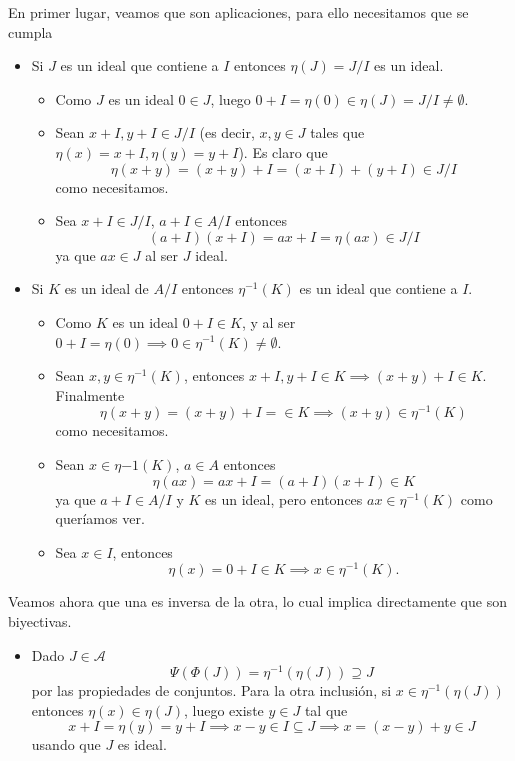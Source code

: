 \begin{proofbox}
    En primer lugar, veamos que son aplicaciones, para ello necesitamos que se cumpla
    \begin{itemize}
        \item Si $J$ es un ideal que contiene a $I$ entonces $\eta(J) = J/I$ es un ideal.
        \begin{itemize}
            \item Como $J$ es un ideal $0 \in J$, luego $0 + I = \eta(0) \in \eta(J) = J/I \neq \emptyset$.
            \item Sean $x + I, y + I \in J/I$ (es decir, $x, y \in J$ tales que $\eta(x) = x + I, \eta(y) = y + I$). Es claro que
            \[
            \eta(x + y) = (x + y) + I = (x + I) + (y + I) \in J/I
            \]
            como necesitamos.
            \item Sea $x + I \in J/I$, $a + I \in A/I$ entonces
            \[
            (a + I)(x + I) = ax + I = \eta(ax) \in J/I
            \]
            ya que $ax \in J$ al ser $J$ ideal.
        \end{itemize}

        \item Si $K$ es un ideal de $A/I$ entonces $\eta^{-1}(K)$ es un ideal que contiene a $I$.
        \begin{itemize}
            \item Como $K$ es un ideal $0 + I \in K$, y al ser $0 + I = \eta(0) \implies 0 \in \eta^{-1}(K) \neq \emptyset$.
            
            \item Sean $x,y \in \eta^{-1}(K)$, entonces $x + I, y + I \in K \implies (x+y) + I \in K$. Finalmente
            \[
            \eta(x + y) = (x + y) + I = \in K \implies (x + y) \in \eta^{-1}(K)
            \]
            como necesitamos.
            \item Sean $x \in \eta{-1}(K)$, $a \in A$ entonces
            \[
            \eta(ax) = ax + I = (a + I)(x + I) \in K
            \]
            ya que $a + I \in A/I$ y $K$ es un ideal, pero entonces $ax \in \eta^{-1}(K)$ como queríamos ver.

            \item Sea $x \in I$, entonces
            \[
            \eta(x) = 0 + I \in K \implies x \in \eta^{-1}(K).
            \]
        \end{itemize}
    \end{itemize}

    Veamos ahora que una es inversa de la otra, lo cual implica directamente que son biyectivas.
    \begin{itemize}
        \item Dado $J \in \mathcal{A}$
        \[
        \Psi(\Phi(J)) = \eta^{-1}(\eta(J)) \supseteq J
        \]
        por las propiedades de conjuntos. Para la otra inclusión, si $x \in \eta^{-1}(\eta(J))$ entonces $\eta(x) \in \eta(J)$, luego existe $y\in J$ tal que 
        \[
        x + I = \eta(y) = y + I \implies x - y \in I \subseteq J \implies x = (x - y) + y \in J
        \] 
        usando que $J$ es ideal.


\end{itemize}
\end{proofbox}
